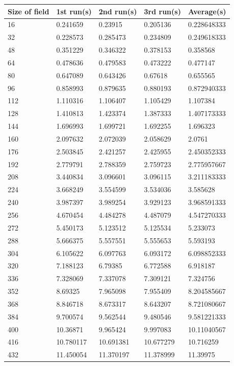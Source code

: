 \begin{table}[H]
\centering
\begin{tabular}{lllll}
\toprule
Size	 of field &1st run(s)&	2nd run(s)&	3rd run(s) &	Average(s)\\
\midrule
16&	0.241659&	0.23915&		0.205136	&	0.228648333\\
32&	0.228573	&	0.285473&	0.234809	&	0.249618333\\
48&	0.351229	&	0.346322	&	0.378153	&	0.358568\\
64&	0.478636	&	0.479583	&	0.473222	&	0.477147\\
80&	0.647089	&	0.643426	&	0.67618	&	0.655565\\
96&	0.858993	&	0.879635	&	0.880193	&	0.872940333\\
112&	1.110316	&	1.106407	&	1.105429	&	1.107384\\
128&	1.410813	&	1.423374	&	1.387333	&	1.407173333\\
144&	1.696993	&	1.699721	&	1.692255	&	1.696323\\
160&	2.097632	&	2.072039	&	2.058629	&	2.0761\\
176&	2.503845	&	2.421257	&	2.425955	&	2.450352333\\
192&	2.779791	&	2.788359	&	2.759723	&	2.775957667\\
208&	3.440834	&	3.096601	&	3.096115	&	3.211183333\\
224&	3.668249	&	3.554599	&	3.534036	&	3.585628\\
240&	3.987397	&	3.989254	&	3.929123	&	3.968591333\\
256&	4.670454	&	4.484278	&	4.487079	&	4.547270333\\
272&	5.450173	&	5.123512	&	5.125534	&	5.233073\\
288&	5.666375	&	5.557551	&	5.555653	&	5.593193\\
304&	6.105622	&	6.097763	&	6.093172	&	6.098852333\\
320&	7.188123	&	6.79385	&	6.772588	&	6.918187\\
336&	7.328069	&	7.337078	&	7.309121	&	7.324756\\
352&	8.69325	&	7.965098	&	7.955409	&	8.204585667\\
368&	8.846718	&	8.673317	&	8.643207	&	8.721080667\\
384&	9.700574	&	9.562544	&	9.480546	&	9.581221333\\
400&	10.36871	&	9.965424	&	9.997083	&	10.11040567\\
416&	10.780117&	10.691381&	10.677279&	10.716259\\
432&	11.450054&	11.370197&	11.378999&	11.39975\\

\end{tabular}
\end{table}
